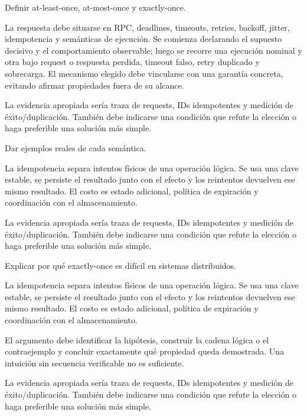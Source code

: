 \documentclass[variant=guia,cover=institutional,mode=screen]{ua-engineering-v6-article}
\begin{document}
\begin{uaexercise}
Definir at-least-once, at-most-once y exactly-once.
\end{uaexercise}
\begin{uaanswer}
La respuesta debe situarse en RPC, deadlines, timeouts, retries, backoff, jitter, idempotencia y semánticas de ejecución. Se comienza declarando el supuesto decisivo y el comportamiento observable; luego se recorre una ejecución nominal y otra bajo request o respuesta perdida, timeout falso, retry duplicado y sobrecarga. El mecanismo elegido debe vincularse con una garantía concreta, evitando afirmar propiedades fuera de su alcance.

La evidencia apropiada sería traza de requests, IDs idempotentes y medición de éxito/duplicación. También debe indicarse una condición que refute la elección o haga preferible una solución más simple.
\end{uaanswer}

\begin{uaexercise}
Dar ejemplos reales de cada semántica.
\end{uaexercise}
\begin{uaanswer}
La idempotencia separa intentos físicos de una operación lógica. Se usa una clave estable, se persiste el resultado junto con el efecto y los reintentos devuelven ese mismo resultado. El costo es estado adicional, política de expiración y coordinación con el almacenamiento.

La evidencia apropiada sería traza de requests, IDs idempotentes y medición de éxito/duplicación. También debe indicarse una condición que refute la elección o haga preferible una solución más simple.
\end{uaanswer}

\begin{uaexercise}
Explicar por qué exactly-once es difícil en sistemas distribuidos.
\end{uaexercise}
\begin{uaanswer}
La idempotencia separa intentos físicos de una operación lógica. Se usa una clave estable, se persiste el resultado junto con el efecto y los reintentos devuelven ese mismo resultado. El costo es estado adicional, política de expiración y coordinación con el almacenamiento.

El argumento debe identificar la hipótesis, construir la cadena lógica o el contraejemplo y concluir exactamente qué propiedad queda demostrada. Una intuición sin secuencia verificable no es suficiente.

La evidencia apropiada sería traza de requests, IDs idempotentes y medición de éxito/duplicación. También debe indicarse una condición que refute la elección o haga preferible una solución más simple.
\end{uaanswer}
\end{document}
